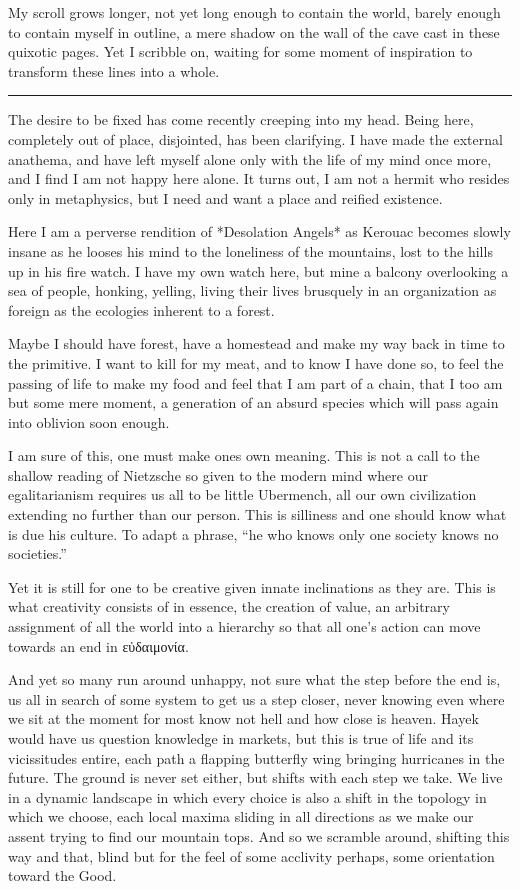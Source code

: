 \documentclass[ebook, 10pt, openright, onecolumn]{memoir}
\newcommand{\textgreek}[1]{\begingroup\fontencoding{LGR}\selectfont#1\endgroup}
\newcommand*\starbreak{\fancybreak*{\Large{* * *}}}
\begin{document}
My scroll grows longer, not yet long enough to contain the world, barely enough
to contain myself in outline, a mere shadow on the wall of the cave cast in
these quixotic pages.  Yet I scribble on, waiting for some moment of inspiration
to transform these lines into a whole.

\starbreak

The desire to be fixed has come recently creeping into my head.  Being here,
completely out of place, disjointed, has been clarifying.  I have made the
external anathema, and have left myself alone only with the life of my mind once
more, and I find I am not happy here alone.  It turns out, I am not a hermit who
resides only in metaphysics, but I need and want a place and reified existence.

Here I am a perverse rendition of *Desolation Angels* as Kerouac becomes slowly
insane as he looses his mind to the loneliness of the mountains, lost to the
hills up in his fire watch.  I have my own watch here, but mine a balcony
overlooking a sea of people, honking, yelling, living their lives brusquely in
an organization as foreign as the ecologies inherent to a forest.

Maybe I should have forest, have a homestead and make my way back in time to the
primitive.  I want to kill for my meat, and to know I have done so, to feel the
passing of life to make my food and feel that I am part of a chain, that I too
am but some mere moment, a generation of an absurd species which will pass again
into oblivion soon enough.

I am sure of this, one must make ones own meaning.  This is not a call to the
shallow reading of Nietzsche so given to the modern mind where our
egalitarianism requires us all to be little Ubermench, all our own civilization
extending no further than our person.  This is silliness and one should know
what is due his culture.  To adapt a phrase, ``he who knows only one society knows
no societies.''

Yet it is still for one to be creative given innate inclinations as they are.
This is what creativity consists of in essence, the creation of value, an
arbitrary assignment of all the world into a hierarchy so that all one's action
can move towards an end in \textgreek{εὐδαιμονία}.

And yet so many run around unhappy, not sure what the step before the end is, us
all in search of some system to get us a step closer, never knowing even where
we sit at the moment for most know not hell and how close is heaven.  Hayek
would have us question knowledge in markets, but this is true of life and its
vicissitudes entire, each path a flapping butterfly wing bringing hurricanes in
the future. The ground is never set either, but shifts with each step we take.
We live in a dynamic landscape in which every choice is also a shift in the
topology in which we choose, each local maxima sliding in all directions as we
make our assent trying to find our mountain tops.  And so we scramble around,
shifting this way and that, blind but for the feel of some acclivity perhaps,
some orientation toward the Good.
\end{document}
